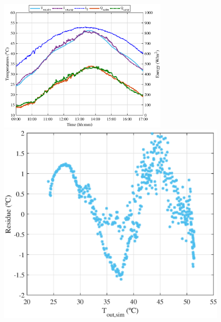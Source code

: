 

\begin{figure}[ht!]
\begin{minipage}{0.60\columnwidth}
		\includegraphics[width=0.99\columnwidth,height=65mm]{figs/004-3.eps}
	\end{minipage}
	\begin{minipage}{0.39\columnwidth}
		\includegraphics[scale=0.5,width=1.0\columnwidth]{figs/004-residue-5.eps}

\end{minipage}
\end{figure}
